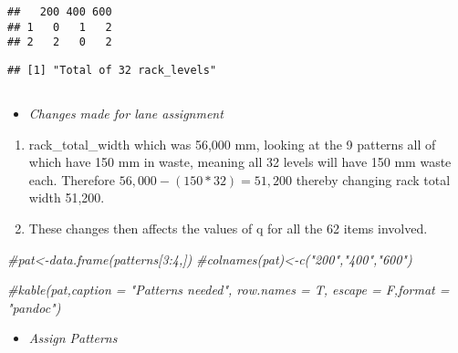 \documentclass[
]{article}
\newenvironment{Shaded}{\begin{snugshade}}{\end{snugshade}}
\newcommand{\CommentTok}[1]{\textcolor[rgb]{0.56,0.35,0.01}{\textit{#1}}}
\newcommand{\KeywordTok}[1]{\textcolor[rgb]{0.13,0.29,0.53}{\textbf{#1}}}
\newcommand{\NormalTok}[1]{#1}
\newcommand{\OperatorTok}[1]{\textcolor[rgb]{0.81,0.36,0.00}{\textbf{#1}}}
\newcommand{\StringTok}[1]{\textcolor[rgb]{0.31,0.60,0.02}{#1}}
\providecommand{\tightlist}{%
  \setlength{\itemsep}{0pt}\setlength{\parskip}{0pt}}
\begin{document}
\begin{verbatim}
##   200 400 600
## 1   0   1   2
## 2   2   0   2
\end{verbatim}

\begin{Shaded}
\end{Shaded}

\begin{verbatim}
## [1] "Total of 32 rack_levels"
\end{verbatim}

\hypertarget{section}{%
\subsection{}\label{section}}

\begin{itemize}
\tightlist
\item
  \emph{Changes made for lane assignment}
\end{itemize}

\begin{enumerate}
\def\labelenumi{\arabic{enumi}.}
\item
  rack\_total\_width which was 56,000 mm, looking at the 9 patterns all
  of which have 150 mm in waste, meaning all 32 levels will have 150 mm
  waste each. Therefore \(56,000 - (150 *32) = 51,200\) thereby changing
  rack total width 51,200.
\item
  These changes then affects the values of q for all the 62 items
  involved.
\end{enumerate}

\begin{Shaded}
\begin{Highlighting}[]
\CommentTok{#pat<-data.frame(patterns[3:4,]) }
\CommentTok{#colnames(pat)<-c("200","400","600")}

\CommentTok{#kable(pat,caption = "Patterns needed", row.names = T, escape = F,format = "pandoc")}
\end{Highlighting}
\end{Shaded}

\begin{itemize}
\tightlist
\item
  \emph{Assign Patterns}
\end{itemize}
\end{document}
